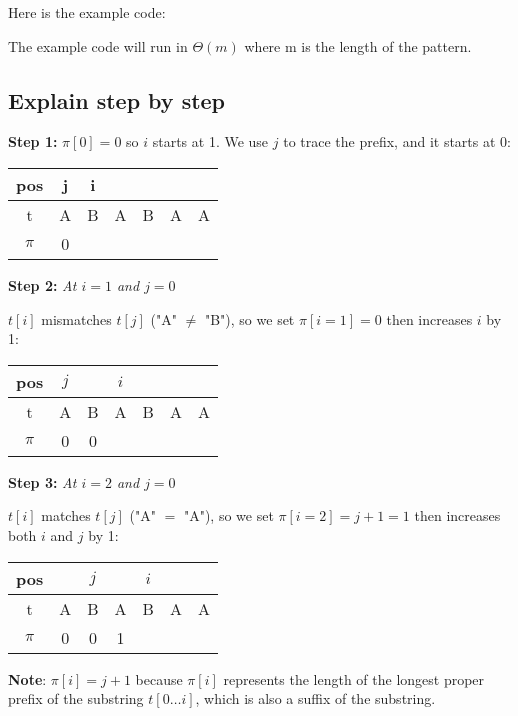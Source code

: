Here is the example code:

The example code will run in $\Theta(m)$ where m is the length of the pattern.
    \subsection *{Explain step by step}
    \textbf{Step 1: }$\pi[0] = 0$ so $i$ starts at 1. We use $j$ to trace the prefix, and it starts at 0:

    \begin{table}[H]
    \centering
    \begin{tabular}{|c|c|c|c|c|c|c|}
    \hline
    pos   & j & i &   &   &   &   \\ \hline
    t     & A & B & A & B & A & A \\ \hline
    $\pi$ & 0 &   &   &   &   &   \\ \hline
    \end{tabular}
    \end{table}
    
    \textbf{Step 2: }\textit{At $i = 1$ and $j = 0$}
    
    $t[i]$ mismatches $t[j]$ ("A" $\neq$ "B"), so we set $\pi[i = 1] = 0$ then increases $i$ by 1:
    \begin{table}[H]
    \centering
    \begin{tabular}{|c|c|c|c|c|c|c|}
    \hline
    pos   & $j$ &   & $i$ &   &   &   \\ \hline
    t     & A & B & A & B & A & A \\ \hline
    $\pi$ & 0 & 0 &   &   &   &   \\ \hline
    \end{tabular}
    \end{table}

    \textbf{Step 3: }\textit{At $i = 2$ and $j = 0$}
    
    $t[i]$ matches $t[j]$ ("A" $=$ "A"), so we set $\pi[i = 2] = j + 1 = 1$ then increases both $i$ and $j$ by 1:
    \begin{table}[H]
    \centering
    \begin{tabular}{|c|c|c|c|c|c|c|}
    \hline
    pos   &   & $j$ &   & $i$ &   &   \\ \hline
    t     & A & B & A & B & A & A \\ \hline
    $\pi$ & 0 & 0 & 1 &   &   &   \\ \hline
    \end{tabular}
    \end{table}
    \textbf{Note}: $\pi[i] = j + 1$ because $\pi[i]$ represents the length of the longest proper prefix of the substring $t[0\dots i]$, which is also a suffix of the substring.
    
